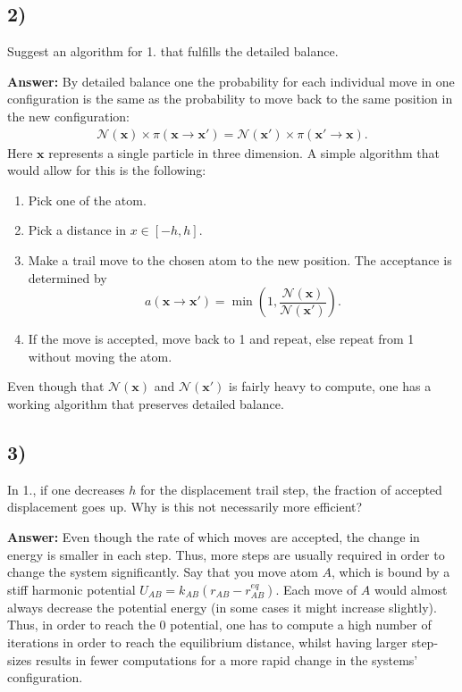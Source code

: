 \documentclass[a4paper]{article}
\newcommand{\newparagraph}{\vspace{.5cm}\noindent}
\begin{document}
\subsection*{2)}
Suggest an algorithm for {\color{red} 1.} that fulfills the detailed balance.

\newparagraph
\textbf{Answer: }By detailed balance one the probability for each individual move in one configuration is the same as the probability to move back to the same position in the new configuration:
\begin{align*}
    \mathcal{N}(\mathbf{x})\times \pi(\mathbf{x}\to\mathbf{x}') = \mathcal{N}(\mathbf{x}')\times \pi(\mathbf{x}'\to\mathbf{x}).
\end{align*}Here $\mathbf{x}$ represents a single particle in three dimension. A simple algorithm that would allow for this is the following:
\begin{enumerate}
    \item Pick one of the atom.
    \item Pick a distance in $x\in[-h, h]$.
    \item Make a trail move to the chosen atom to the new position. The acceptance is determined by $$a(\mathbf{x}\to\mathbf{x}')=\min\left(1,\frac{\mathcal{N}(\mathbf{x})}{\mathcal{N}(\mathbf{x}')}\right).$$
    \item If the move is accepted, move back to 1 and repeat, else repeat from 1 without moving the atom.
\end{enumerate}
Even though that $\mathcal{N}(\mathbf{x})$ and $\mathcal{N}(\mathbf{x}')$ is fairly heavy to compute, one has a working algorithm that preserves detailed balance.



\subsection*{3)}
In {\color{red} 1.}, if one decreases $h$ for the displacement trail step, the fraction of accepted displacement goes up. Why is this not necessarily more efficient?

\newparagraph
\textbf{Answer: }Even though the rate of which moves are accepted, the change in energy is smaller in each step.
Thus, more steps are usually required in order to change the system significantly. Say that you move atom $A$, which is bound by a stiff harmonic potential $U_{AB} = k_{AB}(r_{AB} - r_{AB}^{eq})$.
Each move of $A$ would almost always decrease the potential energy (in some cases it might increase slightly).
Thus, in order to reach the $0$ potential, one has to compute a high number of iterations in order to reach the equilibrium distance, whilst having larger step-sizes results in fewer computations for a more rapid change in the systems' configuration.
\end{document}
